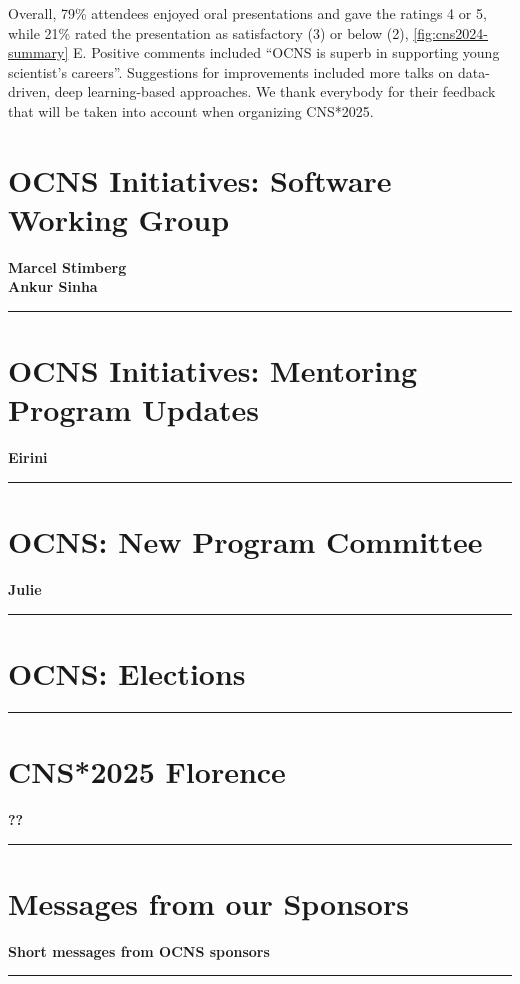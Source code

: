 \documentclass[11pt,a4paper,oneside]{article}
\begin{document}
Overall, 79\% attendees enjoyed oral presentations and gave the ratings 4 or 5, while 21\% rated the presentation as satisfactory (3) or below (2), \cref{fig:cns2024-summary} E.
Positive comments included \enquote{OCNS is superb in supporting young scientist's careers}.
Suggestions for improvements included more talks on data-driven, deep learning-based approaches.
We thank everybody for their feedback that will be taken into account when organizing CNS*2025.


\newpage
\section*{OCNS Initiatives: Software Working Group}%
\textbf{\large Marcel Stimberg \\
Ankur Sinha\\}
\rule{\textwidth}{0.4pt}
\lipsum[1-3]

\newpage
\section*{OCNS Initiatives: Mentoring Program Updates}%
\textbf{\large Eirini\\}
\rule{\textwidth}{0.4pt}
\lipsum[1-3]

\newpage
\section*{OCNS: New Program Committee}%
\textbf{\large Julie\\}
\rule{\textwidth}{0.4pt}
\lipsum[1-3]

\newpage
\section*{OCNS: Elections}%
\rule{\textwidth}{0.4pt}
\lipsum[1-3]

\newpage
\section*{CNS*2025 Florence}%
\textbf{\large ??\\}
\rule{\textwidth}{0.4pt}
\lipsum[1-3]

\newpage

\newpage

\newpage
\section*{Messages from our Sponsors}%
\textbf{\large Short messages from OCNS sponsors\\}
\rule{\textwidth}{0.4pt}
\end{document}
